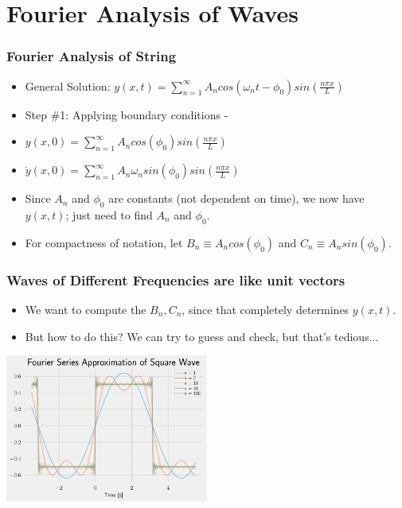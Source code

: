 \documentclass[pdf, handout, hideothersubsections]{beamer}
\begin{document}
\section{Fourier Analysis of Waves}

\begin{frame}
  \frametitle{Fourier Analysis of String}
  \pause
  \begin{itemize}
  \item General Solution: $y(x, t) = \sum_{n=1}^{\infty} A_n cos(\omega_n t - \phi_0) sin(\frac{n \pi x}{L})$
    \pause
  \item Step \#1: Applying boundary conditions -
    \pause
  \item $y(x, 0) = \sum_{n=1}^{\infty} A_n cos(\phi_0) sin(\frac{n \pi x}{L})$
    \pause
  \item $\dot{y}(x, 0) = \sum_{n=1}^{\infty} A_n \omega_n sin(\phi_0)
    sin(\frac{n \pi x}{L})$
    \pause
  \item Since $A_n$ and $\phi_0$ are constants (not dependent on
    time), we now have $y(x, t)$; just need to find $A_n$ and $\phi_0$.
    \pause
  \item For compactness of notation, let $B_n \equiv A_n cos(\phi_0)$
    and $C_n \equiv A_n sin(\phi_0)$.
  \end{itemize}

\end{frame}

\begin{frame}
\frametitle{Waves of Different Frequencies are like unit vectors}
\begin{itemize}
\item We want to compute the $B_n, C_n$, since that completely determines $y(x,t)$.
\pause
\item But how to do this? We can try to guess and check, but that's
  tedious...
\pause

\end{itemize}

\centering
\includegraphics[width=0.5\textwidth]{../../Simulations/FourierSquareWave.pdf}

\end{frame}
\end{document}
